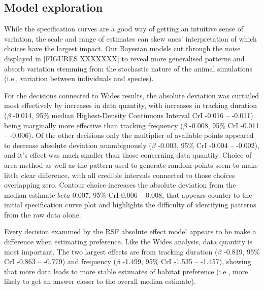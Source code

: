 \documentclass[10pt,a4paper]{article}
\begin{document}
\hypertarget{model-exploration}{%
\subsection{Model exploration}\label{model-exploration}}

While the specification curves are a good way of getting an intuitive sense of variation, the scale and range of estimates can skew ones' interpretation of which choices have the largest impact.
Our Bayesian models cut through the noise displayed in {[}FIGURES XXXXXXX{]} to reveal more generalised patterns and absorb variation stemming from the stochastic nature of the animal simulations (i.e., variation between individuals and species).

For the decisions connected to Wides results, the absolute deviation was curtailed most effectively by increases in data quantity, with increases in tracking duration (\(\beta\) -0.014, 95\% median Highest-Density Continuous Interval CrI -0.016 -- -0.011) being marginally more effective than tracking frequency (\(\beta\) -0.008, 95\% CrI -0.011 -- -0.006).
Of the other decisions only the multiplier of available points appeared to decrease absolute deviation unambiguously (\(\beta\) -0.003, 95\% CrI -0.004 -- -0.002), and it's effect was much smaller than those concerning data quantity.
Choice of area method as well as the pattern used to generate random points seem to make little clear difference, with all credible intervals connected to those choices overlapping zero.
Contour choice increases the absolute deviation from the median estimate \(beta\) 0.007, 95\% CrI 0.006 -- 0.008, that appears counter to the initial specification curve plot and highlights the difficulty of identifying patterns from the raw data alone.

Every decision examined by the RSF absolute effect model appears to be make a difference when estimating preference.
Like the Wides analysis, data quantity is most important.
The two largest effects are from tracking duration (\(\beta\) -0.819, 95\% CrI -0.863 -- -0.779) and frequency (\(\beta\) -1.499, 95\% CrI -1.535 -- -1.457), showing that more data leads to more stable estimates of habitat preference (i.e., more likely to get an answer closer to the overall median estimate).
\end{document}

